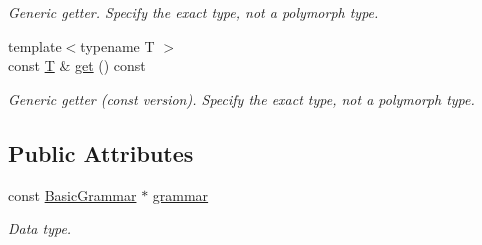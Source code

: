 \begin{DoxyCompactItemize}
\begin{DoxyCompactList}\small\item\em Generic getter. Specify the exact type, not a polymorph type. \item\end{DoxyCompactList}\item 
{\footnotesize template$<$typename T $>$ }\\const \hyperlink{class_t}{T} \& \hyperlink{class_d_d4hep_1_1_opaque_data_a1f0b1e15c715366ae8b0d9fb0e971880}{get} () const 
\begin{DoxyCompactList}\small\item\em Generic getter (const version). Specify the exact type, not a polymorph type. \item\end{DoxyCompactList}\end{DoxyCompactItemize}
\subsection*{Public Attributes}
\begin{DoxyCompactItemize}
\item 
const \hyperlink{class_d_d4hep_1_1_basic_grammar}{BasicGrammar} $\ast$ \hyperlink{class_d_d4hep_1_1_opaque_data_ac911f7e23be3e5d583bf5ccebae03e31}{grammar}
\begin{DoxyCompactList}\small\item\em Data type. \item\end{DoxyCompactList}\end{DoxyCompactItemize}
